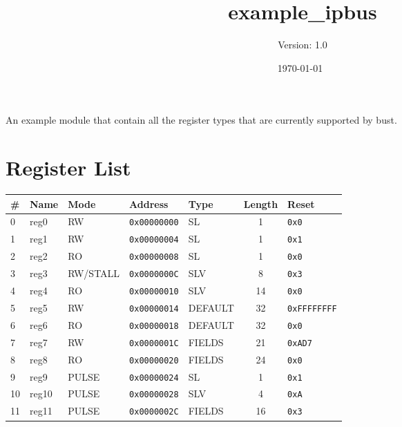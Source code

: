 \documentclass{article}
\title{example{\_}ipbus}
\author{Version: 1.0}
\date{\today\ \currenttime}
\begin{document}
\maketitle
\thispagestyle{fancy}

An example module that contain all the register types that are currently supported by bust.

\section{Register List}

\begin{table}[h!]
  \begin{center}
    \label{tab:table1}
    \begin{tabularx}{\linewidth}{|l|X|l|l|l|c|l|}
      \hline
      \textbf{\#} & \textbf{Name} & \textbf{Mode} & \textbf{Address} & \textbf{Type} & \textbf{Length} &
      \textbf{Reset} \\
      \hline
      0 & reg0 & RW & \texttt{0x00000000} & SL & 1 & \texttt{0x0} \\
      \hline
      1 & reg1 & RW & \texttt{0x00000004} & SL & 1 & \texttt{0x1} \\
      \hline
      2 & reg2 & RO & \texttt{0x00000008} & SL & 1 & \texttt{0x0} \\
      \hline
      3 & reg3 & RW/STALL & \texttt{0x0000000C} & SLV & 8 & \texttt{0x3} \\
      \hline
      4 & reg4 & RO & \texttt{0x00000010} & SLV & 14 & \texttt{0x0} \\
      \hline
      5 & reg5 & RW & \texttt{0x00000014} & DEFAULT & 32 & \texttt{0xFFFFFFFF} \\
      \hline
      6 & reg6 & RO & \texttt{0x00000018} & DEFAULT & 32 & \texttt{0x0} \\
      \hline
      7 & reg7 & RW & \texttt{0x0000001C} & FIELDS & 21 & \texttt{0xAD7} \\
      \hline
      8 & reg8 & RO & \texttt{0x00000020} & FIELDS & 24 & \texttt{0x0} \\
      \hline
      9 & reg9 & PULSE & \texttt{0x00000024} & SL & 1 & \texttt{0x1} \\
      \hline
      10 & reg10 & PULSE & \texttt{0x00000028} & SLV & 4 & \texttt{0xA} \\
      \hline
      11 & reg11 & PULSE & \texttt{0x0000002C} & FIELDS & 16 & \texttt{0x3} \\
      \hline
    \end{tabularx}
  \end{center}
\end{table}
\end{document}
